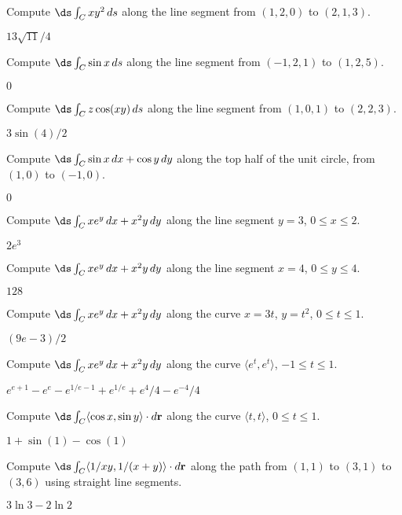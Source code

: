 \begin{exercises}

\exercise Compute $\ds\int_C xy^2\,ds$ along the line segment from
$(1,2,0)$ to $(2,1,3)$.
\begin{answer} $13\sqrt{11}/4$
\end{answer}

\exercise Compute $\ds\int_C \sin x\,ds$ along the line segment from
$(-1,2,1)$ to $(1,2,5)$.
\begin{answer} $0$
\end{answer}

\exercise Compute $\ds\int_C z\cos(xy)\,ds$ along the line segment from
$(1,0,1)$ to $(2,2,3)$.
\begin{answer} $3\sin(4)/2$
\end{answer}

\exercise Compute $\ds\int_C \sin x\,dx+\cos y\,dy$ along the top half
of the unit circle, from $(1,0)$ to $(-1,0)$.
\begin{answer} $0$
\end{answer}

\exercise Compute $\ds\int_C xe^y\,dx+x^2y\,dy$ along the line segment
$y=3$, $0\le x\le 2$.
\begin{answer} $2e^3$
\end{answer}

\exercise Compute $\ds\int_C xe^y\,dx+x^2y\,dy$ along the line segment
$x=4$, $0\le y\le 4$.
\begin{answer} $128$
\end{answer}

\exercise Compute $\ds\int_C xe^y\,dx+x^2y\,dy$ along the curve
$x=3t$, $y=t^2$, $0\le t\le1$.
\begin{answer} $(9e-3)/2$
\end{answer}

\exercise Compute $\ds\int_C xe^y\,dx+x^2y\,dy$ along the 
curve $\langle e^t,e^t\rangle$, $-1\le t\le1$.
\begin{answer} $e^{e+1}-e^e-e^{1/e-1}+e^{1/e}+e^4/4-e^{-4}/4$
\end{answer}

\exercise Compute $\ds\int_C \langle \cos x,\sin y\rangle\cdot 
d{\bf r}$ along the 
curve $\langle t,t\rangle$, $0\le t\le1$.
\begin{answer} $1+\sin(1)-\cos(1)$
\end{answer}

\exercise Compute $\ds\int_C \langle 1/xy,1/(x+y)\rangle\cdot
d{\bf r}$ along the 
path from $(1,1)$ to $(3,1)$ to $(3,6)$ using straight line segments.
\begin{answer} $3\ln3-2\ln2$
\end{answer}


\end{exercises}
